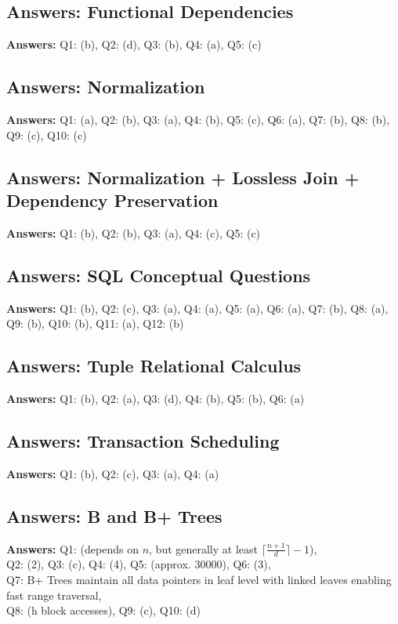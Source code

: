 \subsection*{Answers: Functional Dependencies}
\noindent\textbf{Answers:} Q1: (b), Q2: (d), Q3: (b), Q4: (a), Q5: (c)

\subsection*{Answers: Normalization}
\noindent\textbf{Answers:} Q1: (a), Q2: (b), Q3: (a), Q4: (b), Q5: (c), Q6: (a), Q7: (b), Q8: (b), Q9: (c), Q10: (c)

\subsection*{Answers: Normalization + Lossless Join + Dependency Preservation}
\noindent\textbf{Answers:} Q1: (b), Q2: (b), Q3: (a), Q4: (c), Q5: (c)

\subsection*{Answers: SQL Conceptual Questions}
\noindent\textbf{Answers:} Q1: (b), Q2: (c), Q3: (a), Q4: (a), Q5: (a), Q6: (a), Q7: (b), Q8: (a), Q9: (b), Q10: (b), Q11: (a), Q12: (b)

\subsection*{Answers: Tuple Relational Calculus}
\noindent\textbf{Answers:} Q1: (b), Q2: (a), Q3: (d), Q4: (b), Q5: (b), Q6: (a)

\subsection*{Answers: Transaction Scheduling}
\noindent\textbf{Answers:} Q1: (b), Q2: (c), Q3: (a), Q4: (a)

\subsection*{Answers: B and B+ Trees}
\noindent\textbf{Answers:} Q1: (depends on $n$, but generally at least $\lceil \frac{n+1}{d} \rceil - 1$), \\ 
Q2: (2), Q3: (c), Q4: (4), Q5: (approx. 30000), Q6: (3),  \\
Q7: B+ Trees maintain all data pointers in leaf level with linked leaves enabling fast range traversal,  \\
Q8: (h block accesses), Q9: (c), Q10: (d)

